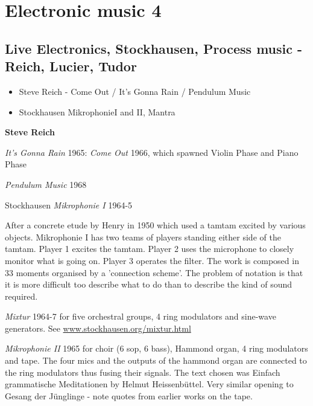 
\chapter{Electronic music 4}
\label{history4}

\section{Live Electronics, Stockhausen, Process music - Reich, Lucier, Tudor }
\begin{itemize}
\item Steve Reich - Come Out / It's Gonna Rain / Pendulum Music
\item Stockhausen MikrophonieI and II, Mantra
\end{itemize}

\textbf{Steve Reich}

\textit{It's Gonna Rain} 1965: \textit{Come Out} 1966,  which spawned Violin Phase and Piano Phase

\textit{Pendulum Music} 1968

Stockhausen \textit{Mikrophonie I} 1964-5

After a concrete etude by Henry in 1950 which used a tamtam excited by various objects. Mikrophonie I has two teams of players standing either side of the tamtam. Player 1 excites the tamtam. Player 2 uses the microphone to closely monitor what is going on. Player 3 operates the filter. The work is composed in 33 moments organised by a 'connection scheme'. The problem of notation is that it is more difficult too describe what to do than to describe the kind of sound required.

\textit{Mixtur} 1964-7 for five orchestral groups, 4 ring modulators and sine-wave generators. See \url{www.stockhausen.org/mixtur.html}

\textit{Mikrophonie II} 1965 for choir (6 sop, 6 bass), Hammond organ, 4 ring modulators and tape. The four mics and the outputs of the hammond organ are connected to the ring modulators thus fusing their signals. The text chosen was Einfach grammatische Meditationen by Helmut Heissenbüttel. Very similar opening to Gesang der Jünglinge - note quotes from earlier works on the tape.

